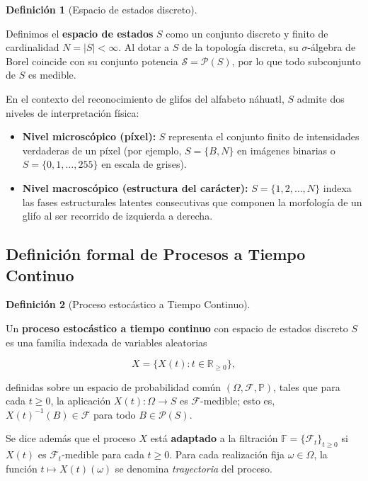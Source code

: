 \documentclass[
  spanish,
  us-letterpaper,
]{scrreprt}
\providecommand{\tightlist}{%
  \setlength{\itemsep}{0pt}\setlength{\parskip}{0pt}}
\theoremstyle{definition}
\newtheorem{definition}{Definición}[chapter]
\theoremstyle{remark}
\begin{document}
\begin{definition}[Espacio de estados
discreto]\protect\hypertarget{def-espacio-discreto}{}\label{def-espacio-discreto}

Definimos el \textbf{espacio de estados} \(S\) como un conjunto discreto
y finito de cardinalidad \(N = |S| < \infty\). Al dotar a \(S\) de la
topología discreta, su \(\sigma\)-álgebra de Borel coincide con su
conjunto potencia \(\mathcal{S} = \mathcal{P}(S)\), por lo que todo
subconjunto de \(S\) es medible.

En el contexto del reconocimiento de glifos del alfabeto náhuatl, \(S\)
admite dos niveles de interpretación física:

\begin{itemize}
\tightlist
\item
  \textbf{Nivel microscópico (píxel):} \(S\) representa el conjunto
  finito de intensidades verdaderas de un píxel (por ejemplo,
  \(S = \{B, N\}\) en imágenes binarias o \(S = \{0, 1, \dots, 255\}\)
  en escala de grises).
\item
  \textbf{Nivel macroscópico (estructura del carácter):}
  \(S = \{1, 2, \dots, N\}\) indexa las fases estructurales latentes
  consecutivas que componen la morfología de un glifo al ser recorrido
  de izquierda a derecha.
\end{itemize}

\end{definition}

\subsection{Definición formal de Procesos a Tiempo
Continuo}\label{definiciuxf3n-formal-de-procesos-a-tiempo-continuo}

\begin{definition}[Proceso estocástico a Tiempo
Continuo]\protect\hypertarget{def-proceso-estocastico}{}\label{def-proceso-estocastico}

Un \textbf{proceso estocástico a tiempo continuo} con espacio de estados
discreto \(S\) es una familia indexada de variables aleatorias

\[
X = \{X(t) : t \in \mathbb{R}_{\ge 0}\},
\]

definidas sobre un espacio de probabilidad común
\((\Omega, \mathcal{F}, \mathbb{P})\), tales que para cada \(t \ge 0\),
la aplicación \(X(t): \Omega \to S\) es \(\mathcal{F}\)-medible; esto
es, \(X(t)^{-1}(B) \in \mathcal{F}\) para todo \(B \in \mathcal{P}(S)\).

Se dice además que el proceso \(X\) está \textbf{adaptado} a la
filtración \(\mathbb{F} = \{\mathcal{F}_t\}_{t \ge 0}\) si \(X(t)\) es
\(\mathcal{F}_t\)-medible para cada \(t \ge 0\). Para cada realización
fija \(\omega \in \Omega\), la función \(t \mapsto X(t)(\omega)\) se
denomina \emph{trayectoria} del proceso.

\end{definition}
\end{document}
